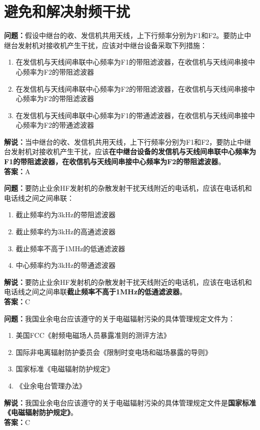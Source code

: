 \chapter{避免和解决射频干扰}




\noindent\textbf{问题：}假设中继台的收、发信机共用天线，上下行频率分别为F1和F2。要防止中继台发射机对接收机产生干扰，应该对中继台设备采取下列措施：
\begin{enumerate}[label=\Alph*), leftmargin=3em]
	\item 在发信机与天线间串联中心频率为F1的带阻滤波器，在收信机与天线间串接中心频率为F2的带阻滤波器
	\item 在发信机与天线间串联中心频率为F2的带阻滤波器，在收信机与天线间串接中心频率为F2的带阻滤波器
	\item 在发信机与天线间串联中心频率为F1的带通滤波器，在收信机与天线间串接中心频率为F2的带通滤波器
\end{enumerate}
\noindent\textbf{解说：}当中继台的收、发信机共用天线，上下行频率分别为F1和F2，要防止中继台发射机对接收机产生干扰，应该\textbf{在中继台设备的发信机与天线间串联中心频率为F1的带阻滤波器，在收信机与天线间串接中心频率为F2的带阻滤波器}。\\\noindent\textbf{答案：}A

\bigskip


\noindent\textbf{问题：}要防止业余HF发射机的杂散发射干扰天线附近的电话机，应该在电话机和电话线之间之间串联：
\begin{enumerate}[label=\Alph*), leftmargin=3em]	
	\item 截止频率约为3kHz的带阻滤波器
	\item 截止频率约为3kHz的高通滤波器
	\item 截止频率不高于1MHz的低通滤波器
	\item 中心频率约为3kHz的带通滤波器
\end{enumerate}
\noindent\textbf{解说：}要防止业余HF发射机的杂散发射干扰天线附近的电话机，应该在电话机和电话线之间之间串联\textbf{截止频率不高于1MHz的低通滤波器}。\\\noindent
\textbf{答案：}C

\bigskip


\noindent\textbf{问题：}我国业余电台应该遵守的关于电磁辐射污染的具体管理规定文件为：
\begin{enumerate}[label=\Alph*), leftmargin=3em]
	\item 美国FCC《射频电磁场人员暴露准则的测评方法》
	\item 国际非电离辐射防护委员会《限制时变电场和磁场暴露的导则》
	\item 国家标准《电磁辐射防护规定》
	\item 《业余电台管理办法》
\end{enumerate}
\noindent\textbf{解说：}我国业余电台应该遵守的关于电磁辐射污染的具体管理规定文件是\textbf{国家标准《电磁辐射防护规定》}。\\
\textbf{答案：}C

